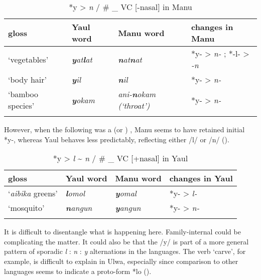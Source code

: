\begin{table}
\caption{*y > \textit{n} / \# \_ VC [-nasal] in Manu}
\label{tab:18.9}


\begin{tabular}{llll}

\lsptoprule

gloss & Yaul word & Manu word & changes in Manu\\
\midrule
‘vegetables’ & {\itshape \textbf{y}at\textbf{l}at} & {\itshape \textbf{n}at\textbf{n}at} & *y- > \textit{n-} ; *-l- > \textit{{}-n}\\
‘body hair’ & {\itshape \textbf{y}il} & {\itshape \textbf{n}il} & *y- > \textit{n-}\\
‘bamboo species’ & {\itshape \textbf{y}okam} & {\itshape ani-\textbf{n}okam \textup{(‘throat’)}} & *y- > \textit{n-}\\
\lspbottomrule
\end{tabular}
\end{table}
However, when the following  was a  (or ) , Manu seems to have retained initial *y-, whereas Yaul behaves less predictably, reflecting either /l/ or /n/ ().


\begin{table}
\caption{*y > \textit{l} {\textasciitilde} \textit{n} / \# \_ VC [+nasal] in Yaul}
\label{tab:18.10}


\begin{tabular}{llll}

\lsptoprule

gloss & Yaul word & Manu word & changes in Yaul\\
\midrule
‘\textit{aibika} greens’ & {\itshape \textbf{l}omol} & {\itshape \textbf{y}omal} & *y- > \textit{l-}\\
‘mosquito’ & {\itshape \textbf{n}angun} & {\itshape \textbf{y}angun} & *y- > \textit{n-}\\
\lspbottomrule
\end{tabular}
\end{table}
It is difficult to disentangle what is happening here. Family-internal  could be complicating the matter. It could also be that the  /y/ is part of a more general pattern of sporadic \textit{l} : \textit{n} : \textit{y} alternations in the  languages. The verb ‘carve’, for example, is difficult to explain in Ulwa, especially since comparison to other  languages seems to indicate a proto-form *lo ().

